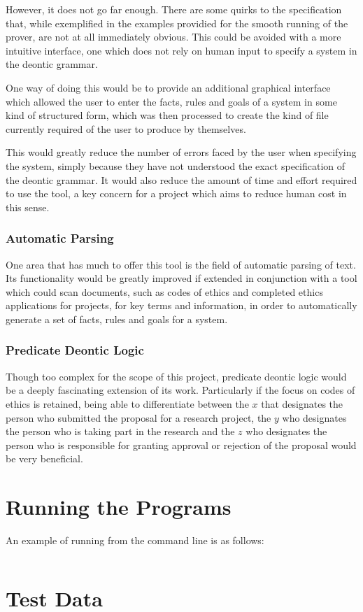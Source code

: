 \documentclass{l4proj}
\begin{document}
However, it does not go far enough. There are some quirks to the specification that, while exemplified in the examples providied for the smooth running of the prover, are not at all immediately obvious. This could be avoided with a more intuitive interface, one which does not rely on human input to specify a system in the deontic grammar. 

One way of doing this would be to provide an additional graphical interface which allowed the user to enter the facts, rules and goals of a system in some kind of structured form, which was then processed to create the kind of file currently required of the user to produce by themselves. 

This would greatly reduce the number of errors faced by the user when specifying the system, simply because they have not understood the exact specification of the deontic grammar. It would also reduce the amount of time and effort required to use the tool, a key concern for a project which aims to reduce human cost in this sense. 

\subsection{Automatic Parsing}
One area that has much to offer this tool is the field of automatic parsing of text. Its functionality would be greatly improved if extended in conjunction with a tool which could scan documents, such as codes of ethics and completed ethics applications for projects, for key terms and information, in order to automatically generate a set of facts, rules and goals for a system. 

\subsection{Predicate Deontic Logic}
Though too complex for the scope of this project, predicate deontic logic would be a deeply fascinating extension of its work. Particularly if the focus on codes of ethics is retained, being able to differentiate between the $x$ that designates the person who submitted the proposal for a research project, the $y$ who designates the person who is taking part in the research and the $z$ who designates the person who is responsible for granting approval or rejection of the proposal would be very beneficial. 

\begin{appendices}

\chapter{Running the Programs}
An example of running from the command line is as follows:
\begin{verbatim}
\end{verbatim}

\chapter{Test Data}

\end{appendices}




\end{document}
